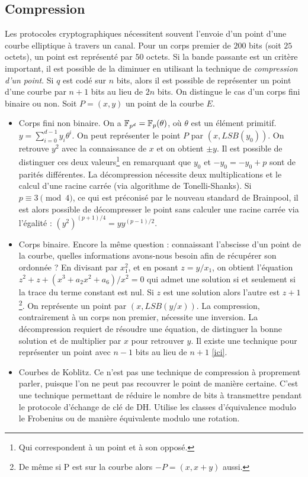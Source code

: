 \documentclass[a4paper]{report}
\begin{document}
\subsection{Compression}
Les protocoles cryptographiques nécessitent souvent l'envoie d'un point d'une courbe elliptique à travers un canal. Pour un corps premier de $200$ bits (soit $25$ octets), un point est représenté par $50$ octets. Si la bande passante est un critère important, il est possible de la diminuer en utilisant la technique de \emph{compression d'un point}. Si $q$ est codé sur $n$ bits, alors il est possible de représenter un point d'une courbe par $n+1$ bits au lieu de $2n$ bits. On distingue le cas d'un corps fini binaire ou non. Soit $P = (x, y)$ un point de la courbe $E$.
\begin{itemize}
    \item Corps fini non binaire. On a $\mathbb{F}_{p^d} = \mathbb{F}_{p}(\theta)$, où $\theta$ est un élément primitif. $y = \sum_{i = 0}^{d-1} y_i \theta^i$. On peut représenter le point $P$ par $(x, LSB(y_0))$. On retrouve $y^2$ avec la connaissance de $x$ et on obtient $\pm y$. Il est possible de distinguer ces deux valeurs\footnote{Qui correspondent à un point et à son opposé.} en remarquant que $y_0$ et $-y_0 = -y_0 + p$ sont de parités différentes. La décompression nécessite deux multiplications et le calcul d'une racine carrée (via algorithme de Tonelli-Shanks).  Si $p \equiv 3 \pmod 4$, ce qui est préconisé par le nouveau standard de Brainpool, il est alors possible de décompresser le point sans calculer une racine carrée via l'égalité : $(y^2)^{(p+1)/4} = y y^{(p-1)/2}$.
    \item Corps binaire. Encore la même question : connaissant l'abscisse d'un point de la courbe, quelles informations avons-nous besoin afin de récupérer son ordonnée ? En divisant par $x_1^2$, et en posant $z = y /x_1$, on obtient l'équation $z^2 + z +(x^3 + a_2x^2 + a_6)/x^2 = 0$ qui admet une solution si et seulement si la trace du terme constant est nul. Si $z$ est une solution alors l'autre est $z + 1$ \footnote{De même si P est sur la courbe alors $-P = (x, x+y)$ aussi.}. On représente un point par $(x, LSB(y/x))$. La compression, contrairement à un corps non premier, nécessite une inversion. La décompression requiert de résoudre une équation, de distinguer la bonne solution et de multiplier par $x$ pour retrouver $y$. Il existe une technique pour représenter un point avec $n-1$ bits au lieu de $n+1$ \href{http://citeseerx.ist.psu.edu/viewdoc/download;jsessionid=FCE13676C67E9FD34EF1BDDE6D898011?doi=10.1.1.26.4672&rep=rep1&type=pdf}{[ici]}.
    \item Courbes de Koblitz. Ce n'est pas une technique de compression à proprement parler, puisque l'on ne peut pas recouvrer le point de manière certaine. C'est une technique permettant de réduire le nombre de bits à transmettre pendant le protocole d'échange de clé de DH. Utilise les classes d'équivalence modulo le Frobenius ou de manière équivalente modulo une rotation. 
\end{itemize}
\end{document}
